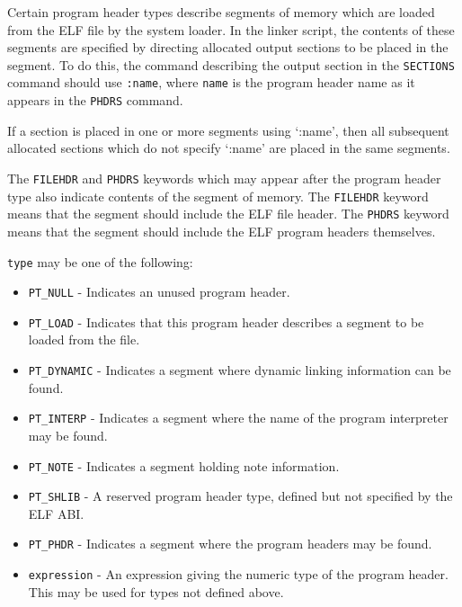 \documentclass[a4paper,12pt,twoside]{report}
\begin{document}
                Certain program header types describe segments of memory which are loaded from the ELF file by the system loader. In the linker script, the contents of these segments are specified by directing allocated output sections to be placed in the segment. To do this, the command describing the output section in the \lstinline|SECTIONS| command should use \lstinline|:name|, where \lstinline|name| is the program header name as it appears in the \lstinline|PHDRS| command.\cite{gnuldProgramHeaders}

                If a section is placed in one or more segments using `:name', then all subsequent allocated sections which do not specify `:name' are placed in the same segments.\cite{gnuldProgramHeaders}

                The \lstinline|FILEHDR| and \lstinline|PHDRS| keywords which may appear after the program header type also indicate contents of the segment of memory. The \lstinline|FILEHDR| keyword means that the segment should include the ELF file header. The \lstinline|PHDRS| keyword means that the segment should include the ELF program headers themselves.\cite{gnuldProgramHeaders}

                \lstinline|type| may be one of the following\cite{gnuldProgramHeaders}:
                \begin{itemize}
                    \item \lstinline|PT_NULL| - Indicates an unused program header.
                    \item \lstinline|PT_LOAD| - Indicates that this program header describes a segment to be loaded from the file.
                    \item \lstinline|PT_DYNAMIC| - Indicates a segment where dynamic linking information can be found.
                    \item \lstinline|PT_INTERP| - Indicates a segment where the name of the program interpreter may be found.
                    \item \lstinline|PT_NOTE| - Indicates a segment holding note information.
                    \item \lstinline|PT_SHLIB| - A reserved program header type, defined but not specified by the ELF ABI.
                    \item \lstinline|PT_PHDR| - Indicates a segment where the program headers may be found.
                    \item \lstinline|expression| - An expression giving the numeric type of the program header. This may be used for types not defined above.
                \end{itemize}
\end{document}
